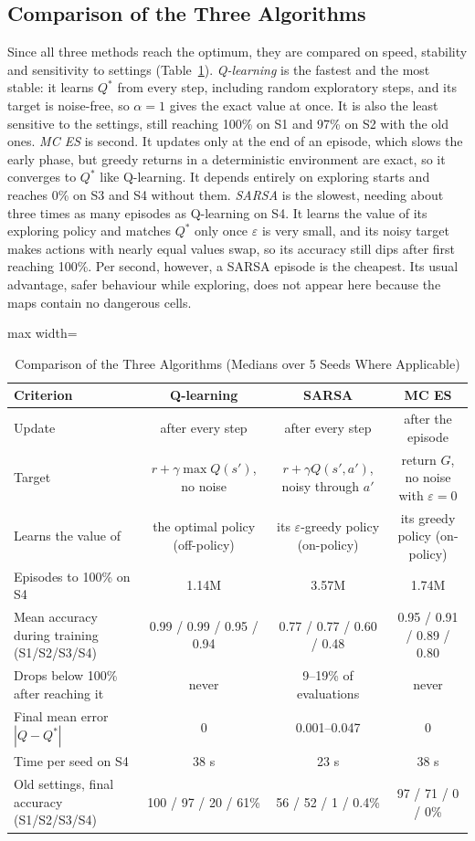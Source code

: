 \documentclass[conference]{IEEEtran}
\newcommand{\Qs}{Q^{*}}
\newcommand{\eps}{\varepsilon}
\begin{document}
\subsection{Comparison of the Three Algorithms}
Since all three methods reach the optimum, they are compared on speed, stability and sensitivity to settings (Table~\ref{tab:compare}). \emph{Q-learning} is the fastest and the most stable: it learns $\Qs$ from every step, including random exploratory steps, and its target is noise-free, so $\alpha=1$ gives the exact value at once. It is also the least sensitive to the settings, still reaching 100\% on S1 and 97\% on S2 with the old ones. \emph{MC ES} is second. It updates only at the end of an episode, which slows the early phase, but greedy returns in a deterministic environment are exact, so it converges to $\Qs$ like Q-learning. It depends entirely on exploring starts and reaches 0\% on S3 and S4 without them. \emph{SARSA} is the slowest, needing about three times as many episodes as Q-learning on S4. It learns the value of its exploring policy and matches $\Qs$ only once $\eps$ is very small, and its noisy target makes actions with nearly equal values swap, so its accuracy still dips after first reaching 100\%. Per second, however, a SARSA episode is the cheapest. Its usual advantage, safer behaviour while exploring, does not appear here because the maps contain no dangerous cells.

\begin{table}[!t]
\caption{Comparison of the Three Algorithms (Medians over 5 Seeds Where Applicable)}
\label{tab:compare}
\centering
\footnotesize
\begin{adjustbox}{max width=\textwidth}
\begin{tabular}{|l|c|c|c|}
\hline
\textbf{Criterion} & \textbf{Q-learning} & \textbf{SARSA} & \textbf{MC ES} \\
\hline
Update & after every step & after every step & after the episode \\
Target & $r+\gamma\max Q(s')$, no noise & $r+\gamma Q(s',a')$, noisy through $a'$ & return $G$, no noise with $\eps=0$ \\
Learns the value of & the optimal policy (off-policy) & its $\eps$-greedy policy (on-policy) & its greedy policy (on-policy) \\
Episodes to 100\% on S4 & 1.14M & 3.57M & 1.74M \\
Mean accuracy during training (S1/S2/S3/S4) & 0.99 / 0.99 / 0.95 / 0.94 & 0.77 / 0.77 / 0.60 / 0.48 & 0.95 / 0.91 / 0.89 / 0.80 \\
Drops below 100\% after reaching it & never & 9--19\% of evaluations & never \\
Final mean error $|Q-\Qs|$ & 0 & 0.001--0.047 & 0 \\
Time per seed on S4 & 38 s & 23 s & 38 s \\
Old settings, final accuracy (S1/S2/S3/S4) & 100 / 97 / 20 / 61\% & 56 / 52 / 1 / 0.4\% & 97 / 71 / 0 / 0\% \\
\hline
\end{tabular}
\end{adjustbox}
\end{table}
\end{document}

